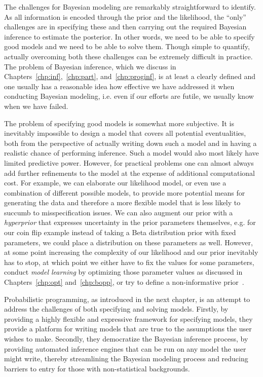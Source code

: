 The challenges for Bayesian modeling are remarkably straightforward to identify.  As all information
is encoded through the prior and the likelihood, the ``only'' challenges are in specifying these
and then carrying out the required Bayesian inference to estimate the posterior.  In other words, we need
to be able to specify good models and we need to be able to solve them.  Though simple to
quantify, actually overcoming both these challenges can be extremely difficult in practice.  The problem
of Bayesian inference, which we discuss in Chapters~\ref{chp:inf},~\ref{chp:part}, and~\ref{chp:proginf},
 is at least a clearly defined and one usually has a reasonable idea
how effective we have addressed it when conducting Bayesian modeling, i.e. even if our efforts are
futile, we usually know when we have failed.  

The problem of specifying good models is somewhat more subjective.  It is inevitably impossible
to design a model that covers all potential eventualities, both from the perspective of actually writing
down such a model and in having a realistic chance of performing inference.  Such a model
would also most likely have limited predictive power.  However, for practical problems one can almost always
add further refinements to the model at the expense of additional computational cost. For example, we can
elaborate our likelihood model, or even use a combination of different possible models, to provide more 
potential means  for generating the data and therefore a more flexible model that is less likely to 
succumb to misspecification issues.  We can also augment our prior with a \emph{hyperprior} that 
expresses uncertainty in the prior parameters themselves, e.g. for our coin flip example instead of
taking a Beta distribution prior with fixed parameters, we could place a distribution on these parameters
as well.  However, at some point increasing the complexity of our likelihood and our prior inevitably 
has to stop, at which point we either have to fix the values for some parameters, conduct
\emph{model learning} by optimizing those parameter values as discussed in Chapters~\ref{chp:opt}
and~\ref{chp:bopp}, or try to define a non-informative prior~\citep{robert2007bayesian}.


Probabilistic programming, as introduced in the next chapter, is an
attempt to address the challenges of both specifying and solving models.  
Firstly, by providing a highly flexible and expressive framework for specifying models, 
they provide a platform for writing models that are true to the assumptions the user wishes
to make.  Secondly, they democratize the Bayesian inference process, by providing automated
inference engines that can be run on any model the user might write, thereby streamlining the Bayesian
modeling process and reducing barriers to entry for those with non-statistical backgrounds.